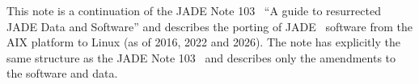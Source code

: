 This note is a continuation of the JADE Note 103~\cite{JCN:103}
``A guide to resurrected JADE Data and Software'' and describes
the porting of JADE~\cite{Bartel:1986ua} software from the AIX platform to Linux
(as of 2016, 2022 and 2026).
The note has explicitly the same structure as the JADE Note 103~\cite{JCN:103} and describes only
the amendments to the software and data.
